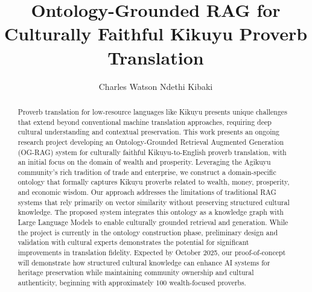 \documentclass[
]{ceurart}
\begin{document}


\title{Ontology-Grounded RAG for Culturally Faithful Kikuyu Proverb Translation}

\author[1]{Charles Watson Ndethi Kibaki}

\address[1]{Open Institute of Technology (OPIT),\\
  MSc in Responsible AI Program\\
  Email: charleswatsonndeth.k@students.opit.com\\
  URL: \url{https://github.com/ndethi/opit-rai9001}}

\begin{abstract}
Proverb translation for low-resource languages like Kikuyu presents unique challenges that extend beyond conventional machine translation approaches, requiring deep cultural understanding and contextual preservation. This work presents an ongoing research project developing an Ontology-Grounded Retrieval Augmented Generation (OG-RAG) system for culturally faithful Kikuyu-to-English proverb translation, with an initial focus on the domain of wealth and prosperity. Leveraging the Agikuyu community's rich tradition of trade and enterprise, we construct a domain-specific ontology that formally captures Kikuyu proverbs related to wealth, money, prosperity, and economic wisdom. Our approach addresses the limitations of traditional RAG systems that rely primarily on vector similarity without preserving structured cultural knowledge. The proposed system integrates this ontology as a knowledge graph with Large Language Models to enable culturally grounded retrieval and generation. While the project is currently in the ontology construction phase, preliminary design and validation with cultural experts demonstrates the potential for significant improvements in translation fidelity. Expected by October 2025, our proof-of-concept will demonstrate how structured cultural knowledge can enhance AI systems for heritage preservation while maintaining community ownership and cultural authenticity, beginning with approximately 100 wealth-focused proverbs.
\end{abstract}
\end{document}
